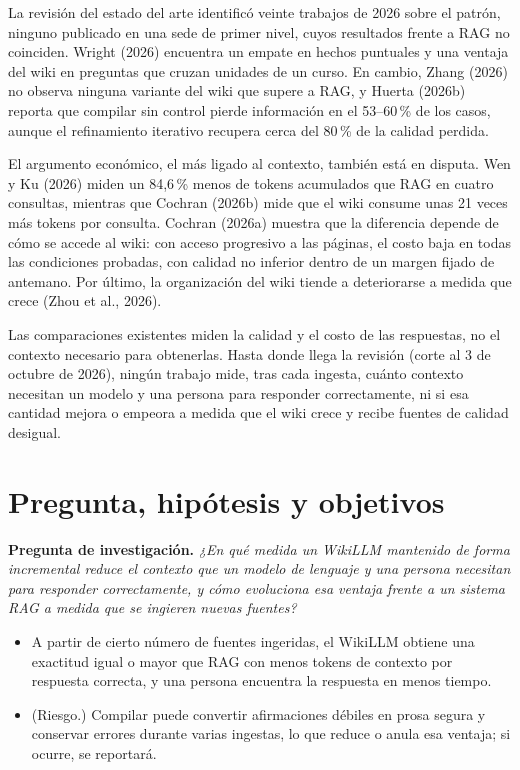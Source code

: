 \documentclass[11pt,letterpaper]{article}
\begin{document}
La revisión del estado del arte identificó veinte trabajos de 2026 sobre el patrón, ninguno
publicado en una sede de primer nivel, cuyos resultados frente a RAG no coinciden. Wright (2026) encuentra un empate en
hechos puntuales y una ventaja del wiki en preguntas que cruzan unidades de un curso. En cambio,
Zhang (2026) no observa ninguna variante del wiki que supere a RAG, y Huerta (2026b) reporta que
compilar sin control pierde información en el 53--60\,\% de los casos, aunque el refinamiento
iterativo recupera cerca del 80\,\% de la calidad perdida.

El argumento económico, el más ligado al contexto, también está en disputa. Wen y Ku (2026) miden un 84,6\,\% menos de tokens acumulados que RAG en cuatro consultas, mientras que Cochran
(2026b) mide que el wiki consume unas 21 veces más tokens por consulta. Cochran (2026a) muestra
que la diferencia depende de cómo se accede al wiki: con acceso progresivo a las páginas, el
costo baja en todas las condiciones probadas, con calidad no inferior dentro de un margen
fijado de antemano. Por último, la organización
del wiki tiende a deteriorarse a medida que crece (Zhou et al., 2026).

Las comparaciones existentes miden la calidad y el costo de las respuestas, no el contexto
necesario para obtenerlas. Hasta donde llega la revisión (corte al 3 de octubre de 2026),
ningún trabajo mide, tras cada ingesta, cuánto contexto necesitan un modelo y una persona
para responder correctamente, ni si esa cantidad mejora o empeora a medida que el wiki crece y
recibe fuentes de calidad desigual.

\section{Pregunta, hipótesis y objetivos}

\noindent\textbf{Pregunta de investigación.} \textit{¿En qué medida un WikiLLM mantenido de forma
incremental reduce el contexto que un modelo de lenguaje y una persona necesitan para responder
correctamente, y cómo evoluciona esa ventaja frente a un sistema RAG a medida que se ingieren
nuevas fuentes?}

\begin{itemize}[leftmargin=2.4em]
\item[H1.] A partir de cierto número de fuentes ingeridas, el WikiLLM obtiene una exactitud igual
o mayor que RAG con menos tokens de contexto por respuesta correcta, y una persona encuentra la
respuesta en menos tiempo.
\item[H2.] (Riesgo.) Compilar puede convertir afirmaciones débiles en prosa segura y conservar
errores durante varias ingestas, lo que reduce o anula esa ventaja; si ocurre, se reportará.
\end{itemize}
\end{document}
